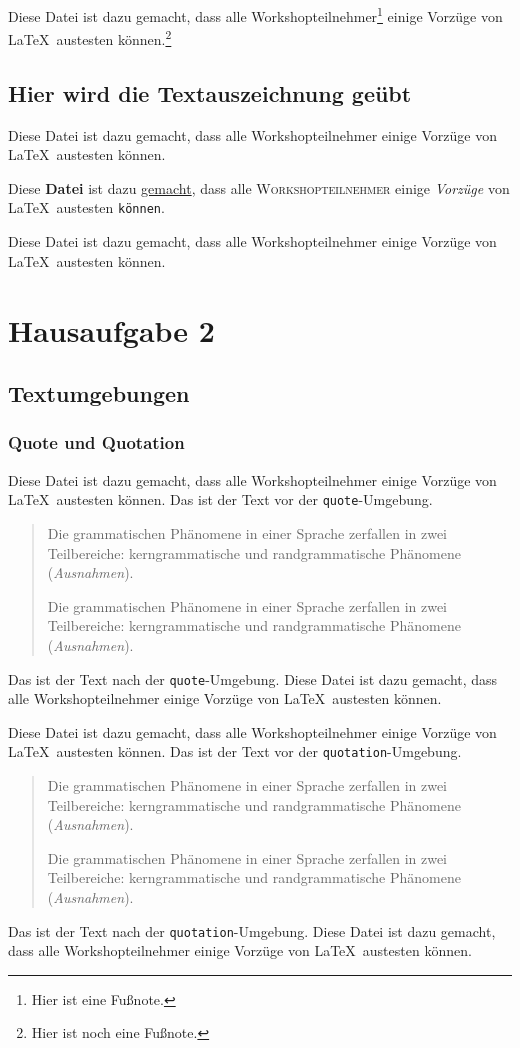 \documentclass[10pt,paper=a4,abstracton]{scrartcl}
\begin{document}
Diese Datei ist dazu gemacht, dass alle Workshopteilnehmer\footnote{Hier ist eine Fußnote.} einige Vorzüge von \LaTeX\ austesten können.\footnote{Hier ist noch eine Fußnote.}


\subsection[Textauszeichnung]{Hier wird die Textauszeichnung geübt}

Diese Datei ist {\tiny dazu} gemacht, dass {\Huge alle} Workshopteilnehmer einige {\Large Vorzüge} von \LaTeX\ austesten können.

Diese \textbf{Datei} ist dazu \underline{gemacht}, dass alle \textsc{Workshopteilnehmer} einige \emph{Vorzüge} von \LaTeX\ austesten \texttt{können}.

\noindent Diese Datei ist dazu gemacht, dass alle Workshopteilnehmer einige Vorzüge von \LaTeX\ austesten können.


\section{Hausaufgabe 2}


\subsection{Textumgebungen}


\subsubsection{Quote und Quotation}

 Diese Datei ist dazu gemacht, dass alle Workshopteilnehmer einige Vorzüge von \LaTeX\ austesten können. Das ist der Text vor der \texttt{quote}-Umgebung.
\begin{quote}
	Die grammatischen Phänomene in einer Sprache zerfallen in zwei Teilbereiche: kerngrammatische und randgrammatische Phänomene (\emph{Ausnahmen}).
	
	Die grammatischen Phänomene in einer Sprache zerfallen in zwei Teilbereiche: kerngrammatische und randgrammatische Phänomene (\emph{Ausnahmen}).
\end{quote}
Das ist der Text nach der \texttt{quote}-Umgebung. Diese Datei ist dazu gemacht, dass alle Workshopteilnehmer einige Vorzüge von \LaTeX\ austesten können.


 Diese Datei ist dazu gemacht, dass alle Workshopteilnehmer einige Vorzüge von \LaTeX\ austesten können. Das ist der Text vor der \texttt{quotation}-Umgebung.
\begin{quotation}
	Die grammatischen Phänomene in einer Sprache zerfallen in zwei Teilbereiche: kerngrammatische und randgrammatische Phänomene (\emph{Ausnahmen}).
	
	Die grammatischen Phänomene in einer Sprache zerfallen in zwei Teilbereiche: kerngrammatische und randgrammatische Phänomene (\emph{Ausnahmen}).
\end{quotation}
Das ist der Text nach der \texttt{quotation}-Umgebung. Diese Datei ist dazu gemacht, dass alle Workshopteilnehmer einige Vorzüge von \LaTeX\ austesten können.
\end{document}
